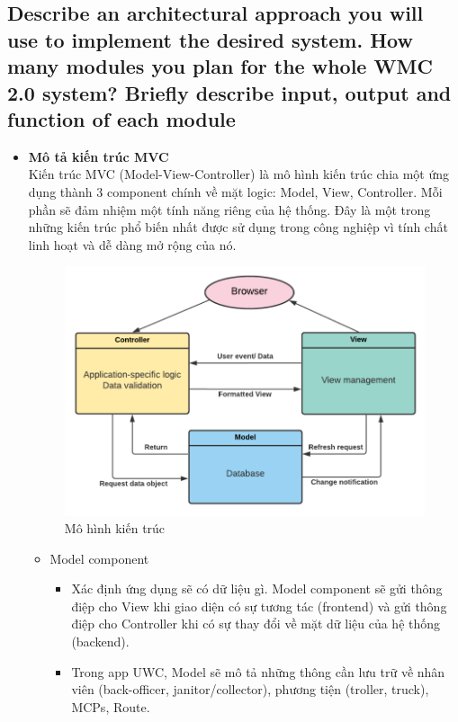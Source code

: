 \documentclass[a4paper]{article}
\begin{document}
\subsection{Describe an architectural approach you will use to implement the desired system. How many modules you plan for the whole WMC 2.0 system? Briefly describe input, output and function of each module}
\begin{itemize}
    \item \textbf{Mô tả kiến trúc MVC}\\
    \newpage
    Kiến trúc MVC (Model-View-Controller) là mô hình kiến trúc chia một ứng dụng thành 3 component chính về mặt logic: Model, View, Controller. Mỗi phần sẽ đảm nhiệm một tính năng riêng của hệ thống. Đây là một trong những kiến trúc phổ biến nhất được sử dụng trong công nghiệp vì tính chất linh hoạt và dễ dàng mở rộng của nó. \\
    \begin{figure}
        \centering
        \includegraphics{Image/MVC.png}
        \caption{Mô hình kiến trúc}
    \end{figure}
    \begin{itemize}
        \item Model component
        \begin{itemize}
            \item Xác định ứng dụng sẽ có dữ liệu gì. Model component sẽ gửi thông điệp cho View khi giao diện có sự tương tác (frontend) và gửi thông điệp cho Controller khi có sự thay đổi về mặt dữ liệu của hệ thống (backend).
            \item Trong app UWC, Model sẽ mô tả những thông cần lưu trữ về nhân viên (back-officer, janitor/collector), phương tiện (troller, truck), MCPs, Route.
        \end{itemize}
        

\end{itemize}
\end{itemize}
\end{document}
